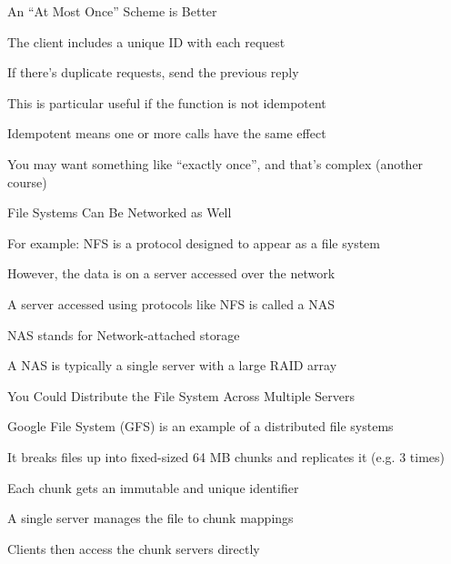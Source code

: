   \begin{frame}{An ``At Most Once'' Scheme is Better}

    The client includes a unique ID with each request

    \hspace{2em} If there's duplicate requests, send the previous reply

    \vspace{2em}

    This is particular useful if the function is not idempotent
    
    \hspace{2em} Idempotent means one or more calls have the same effect

    \vspace{2em}

    You may want something like ``exactly once'', and that's complex (another
    course)
  \end{frame}

  \begin{frame}{File Systems Can Be Networked as Well}

    For example: NFS is a protocol designed to appear as a file system

    \hspace{2em} However, the data is on a server accessed over the network

    \vspace{2em}

    A server accessed using protocols like NFS is called a NAS

    \hspace{2em} NAS stands for Network-attached storage

    \vspace{2em}

    A NAS is typically a single server with a large RAID array
  \end{frame}

  \begin{frame}{You Could Distribute the File System Across Multiple Servers}

    Google File System (GFS) is an example of a distributed file systems

    \vspace{2em}

    It breaks files up into fixed-sized 64 MB chunks and replicates it
    (e.g. 3 times)

    \hspace{2em} Each chunk gets an immutable and unique identifier

    \vspace{2em}

    A single server manages the file to chunk mappings

    \hspace{2em} Clients then access the chunk servers directly
  \end{frame}

